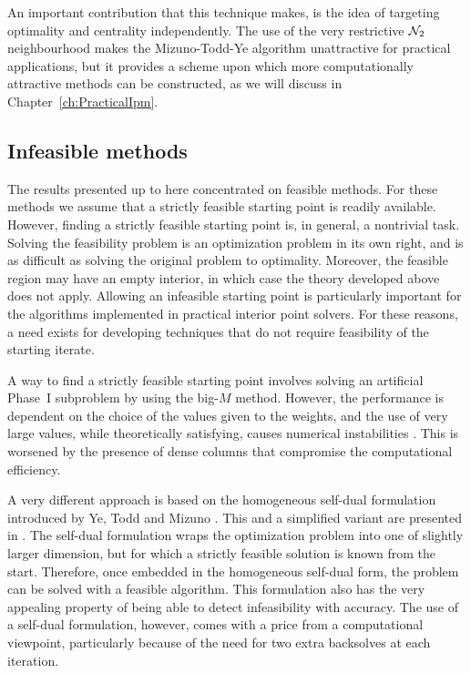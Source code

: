 An important contribution that this technique makes, is the idea 
of targeting optimality and centrality independently. 
The use of the very restrictive $\mathcal{N}_2$ neighbourhood 
makes the Mizuno-Todd-Ye algorithm unattractive for practical applications,
but it provides a scheme 
upon which more computationally attractive methods can be constructed,
as we will discuss in Chapter~\ref{ch:PracticalIpm}.

%
%
\subsection{Infeasible methods}
\label{sec:InfeasibleMethods}

The results presented up to here concentrated on feasible methods. 
For these methods we assume that a strictly feasible starting point is
readily available.
However, finding a strictly feasible starting point is, 
in general, a nontrivial task.
Solving the feasibility problem is an optimization problem in its
own right, and is as difficult as solving the original problem
to optimality.
Moreover, the feasible region may have an empty interior,
in which case the theory developed above does not apply.
Allowing an infeasible starting point is particularly important
for the algorithms implemented in practical interior point solvers.
For these reasons, a need exists for developing techniques
that do not require feasibility of the 
starting iterate.

A way to find a strictly feasible starting point involves 
solving an artificial Phase~I subproblem by using 
the big-$M$ method. However, the performance is dependent on 
the choice of the values given to the weights, and the use
of very large values, while theoretically satisfying,
causes numerical instabilities \cite{Lustig91}.
This is worsened 
by the presence of dense columns that compromise the 
computational efficiency. 

A very different approach is based on the homogeneous 
self-dual formulation introduced by Ye, Todd and Mizuno
\cite{YeToddMizuno94}.
This and a simplified variant are presented in \cite[Chapter~9]{ipm:Wright97}.
The self-dual formulation wraps the optimization problem into one 
of slightly larger dimension, but for which a strictly feasible solution
is known from the start.
Therefore, once embedded in the homogeneous self-dual form,
the problem can be solved with a feasible algorithm.
This formulation also has the very
appealing property of being able to detect infeasibility
with accuracy.
The use of a self-dual formulation, however, comes with a price from a
computational viewpoint, particularly because of the need for
two extra backsolves at each iteration.

